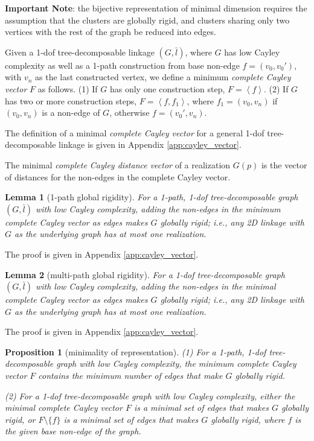 \documentclass[secthm,amsthm,english]{article}
\newtheorem{lemma}{Lemma}
\newtheorem{proposition}{Proposition}
\theoremstyle{definition}
\theoremstyle{remark}
\begin{document}
\noindent\textbf{Important Note}: the bijective representation of minimal dimension requires the assumption 
that the clusters are globally rigid, and 
clusters sharing only two vertices with the rest of the graph be reduced into edges. 
\smallskip

Given a 1-dof tree-decomposable linkage $(G,\bar{l})$, 
where $G$ has low Cayley complexity as well as a 1-path construction from base non-edge $f=(v_0,v_0')$, with $v_n$ as the last constructed vertex, 
we define a minimum \emph{complete Cayley vector} $F$ as follows.
(1) If $G$ has only one construction step, $F = \left<f\right>$.
(2) If $G$ has two or more construction steps, $F=\left<f,f_1\right>$, 
where $f_1 = (v_0,v_n)$ if $(v_0,v_n)$ is a non-edge of $G$, otherwise $f=(v_0',v_n)$. 

The definition of a minimal \emph{complete Cayley vector}
for a general 1-dof tree-decomposable linkage 
is given  in Appendix \ref{app:cayley_vector}.

The minimal \emph{complete Cayley distance vector} of a realization $G(p)$
is the vector of distances for the non-edges in the complete Cayley vector. 

\smallskip

\begin{lemma}[1-path global rigidity] \label{lem:globally_rigid_1path}
For a 1-path, 1-dof tree-decomposable graph $(G,\bar{l})$ with low Cayley complexity, 
adding the non-edges in the minimum complete Cayley vector as edges 
makes $G$ \emph{globally rigid}; i.e., 
any 2D linkage with $G$ as the underlying graph has at most one realization. 
\end{lemma}


The proof is given in Appendix \ref{app:cayley_vector}.


\smallskip

\begin{lemma}[multi-path global rigidity] \label{lem:globally_rigid_multi}
For a 1-dof tree-decomposable graph $(G,\bar{l})$ with low Cayley complexity, 
adding the non-edges in the minimal complete Cayley vector as edges 
makes $G$ \emph{globally rigid}; i.e., 
any 2D linkage with $G$ as the underlying graph has at most one realization. 
\end{lemma}

The proof is given in Appendix \ref{app:cayley_vector}.


\smallskip

\begin{proposition}[minimality of representation]
\noindent (1) 
For a 1-path, 1-dof tree-decomposable graph with low Cayley complexity,
 the minimum complete Cayley vector $F$ contains the minimum number of edges that make $G$ globally rigid.

\noindent (2) 
For a 1-dof tree-decomposable graph with low Cayley complexity,
either the minimal complete Cayley vector $F$ is a minimal set of edges that makes $G$ globally rigid, 
or $F \setminus \{f\}$ is a minimal set of edges that makes $G$ globally rigid,
where $f$ is the given base non-edge of the graph.
\end{proposition}
\end{document}
